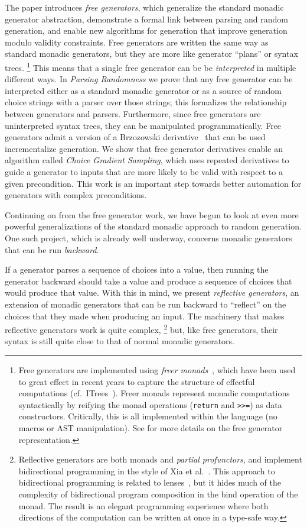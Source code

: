 The paper introduces {\em free generators}, which generalize the standard
monadic generator abstraction, demonstrate a formal link between parsing and
random generation, and enable new algorithms for generation that improve
generation modulo validity constraints. Free generators are written the same
way as standard monadic generators, but they are more like generator ``plans''
or syntax trees.%
\footnote{Free generators are implemented using {\em freer
monads}~\cite{kiselyov2015freer}, which have been used to great effect in recent
years to capture the structure of effectful computations
(cf.~ITrees~\cite{old:xia2019interaction}). Freer monads represent
monadic computations syntactically by reifying the monad operations
(\lstinline{return} and \lstinline{>>=}) as data constructors. Critically, this
is all implemented within the language (no macros or AST
manipulation). See \cite{goldstein2022parsing} for more details on the
free generator representation.}
This means that a single free generator can be be {\em interpreted} in multiple
different ways. In {\em Parsing Randomness} we prove that any free generator can
be interpreted either as a standard monadic generator or as a source of
random choice strings with a parser over those strings; this formalizes the
relationship between generators and parsers. Furthermore, since free generators
are uninterpreted syntax trees, they can be manipulated programmatically. Free
generators admit a version of a Brzozowski
derivative~\cite{brzozowski1964derivatives} that can be used incrementalize
generation. We show that free generator derivatives enable an algorithm called
{\em Choice Gradient Sampling}, which uses repeated derivatives to guide a
generator to inputs that are more likely to be valid with respect to a given
precondition. This work is an important step towards better automation for
generators with complex preconditions.

Continuing on from the free generator work, we have begun to look at even more
powerful generalizations of the standard monadic approach to random generation.
One such project, which is already well underway, concerns monadic generators
that can be run {\em backward}.

If a generator parses a sequence of choices into a value, then running the
generator backward should take a value and produce a sequence of choices that
would produce that value. With this in mind, we present {\em reflective
generators}, an extension of monadic generators that can be run backward to
``reflect'' on the choices that they made when producing an input. The machinery
that makes reflective generators work is quite complex,%
\footnote{Reflective generators are both monads and {\em partial profunctors},
and implement bidirectional programming in the style of Xia et
al.~\cite{xia2019composing}. This approach to bidirectional programming is
related to lenses~\cite{foster2009bidirectional}, but it hides much of the
complexity of bidirectional program composition in the bind operation of the
monad. The result is an elegant programming experience where both directions of
the computation can be written at once in a type-safe way.}
but, like free generators, their syntax is still quite close to that of normal
monadic generators.

